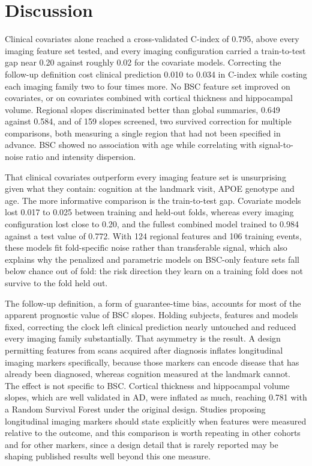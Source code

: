 \documentclass[blue]{ludusofficial}  %
\begin{document}
\section{Discussion}

Clinical covariates alone reached a cross-validated C-index of 0.795, above every imaging feature set tested, and every imaging configuration carried a train-to-test gap near 0.20 against roughly 0.02 for the covariate models. Correcting the follow-up definition cost clinical prediction 0.010 to 0.034 in C-index while costing each imaging family two to four times more. No BSC feature set improved on covariates, or on covariates combined with cortical thickness and hippocampal volume. Regional slopes discriminated better than global summaries, 0.649 against 0.584, and of 159 slopes screened, two survived correction for multiple comparisons, both measuring a single region that had not been specified in advance. BSC showed no association with age while correlating with signal-to-noise ratio and intensity dispersion.

That clinical covariates outperform every imaging feature set is unsurprising given what they contain: cognition at the landmark visit, APOE genotype and age. The more informative comparison is the train-to-test gap. Covariate models lost 0.017 to 0.025 between training and held-out folds, whereas every imaging configuration lost close to 0.20, and the fullest combined model trained to 0.984 against a test value of 0.772. With 124 regional features and 106 training events, these models fit fold-specific noise rather than transferable signal, which also explains why the penalized and parametric models on BSC-only feature sets fall below chance out of fold: the risk direction they learn on a training fold does not survive to the fold held out.

The follow-up definition, a form of guarantee-time bias, accounts for most of the apparent prognostic value of BSC slopes. Holding subjects, features and models fixed, correcting the clock left clinical prediction nearly untouched and reduced every imaging family substantially. That asymmetry is the result. A design permitting features from scans acquired after diagnosis inflates longitudinal imaging markers specifically, because those markers can encode disease that has already been diagnosed, whereas cognition measured at the landmark cannot. The effect is not specific to BSC. Cortical thickness and hippocampal volume slopes, which are well validated in AD, were inflated as much, reaching 0.781 with a Random Survival Forest under the original design. Studies proposing longitudinal imaging markers should state explicitly when features were measured relative to the outcome, and this comparison is worth repeating in other cohorts and for other markers, since a design detail that is rarely reported may be shaping published results well beyond this one measure.
\end{document}

